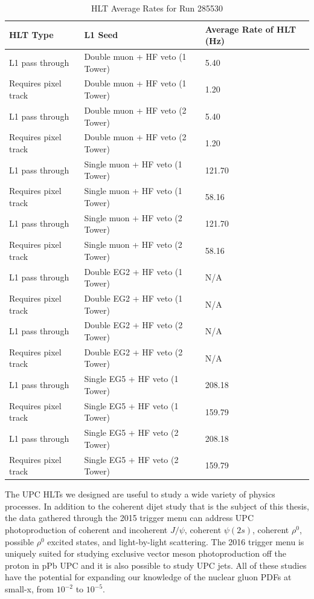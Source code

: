 \begin{table}[h!]
\centering
\caption{HLT Average Rates for Run 285530}
\label{table:trigHLTUPC2016}
\begin{tabular}{@{}lll@{}}
\toprule
HLT Type             & L1 Seed                           & Average Rate of HLT (Hz) \\ \midrule
L1 pass through      & Double muon + HF veto (1 Tower) & 5.40	                    \\
Requires pixel track & Double muon + HF veto (1 Tower) & 1.20	                    \\
L1 pass through      & Double muon + HF veto (2 Tower) & 5.40                     	\\
Requires pixel track & Double muon + HF veto (2 Tower) & 1.20                     	\\
L1 pass through      & Single muon + HF veto (1 Tower) & 121.70                   	\\
Requires pixel track & Single muon + HF veto (1 Tower) & 58.16                    	\\
L1 pass through      & Single muon + HF veto (2 Tower) & 121.70	                    \\
Requires pixel track & Single muon + HF veto (2 Tower) & 58.16                    	\\
L1 pass through      & Double EG2 + HF veto (1 Tower)  & N/A                     	\\
Requires pixel track & Double EG2 + HF veto (1 Tower)  & N/A                     	\\
L1 pass through      & Double EG2 + HF veto (2 Tower)  & N/A                  		\\
Requires pixel track & Double EG2 + HF veto (2 Tower)  & N/A                     	\\ 
L1 pass through      & Single EG5 + HF veto (1 Tower)  & 208.18          			\\
Requires pixel track & Single EG5 + HF veto (1 Tower)  & 159.79                     \\
L1 pass through      & Single EG5 + HF veto (2 Tower)  & 208.18                     \\
Requires pixel track & Single EG5 + HF veto (2 Tower)  & 159.79	                    \\ \bottomrule
\end{tabular}
\end{table}

The UPC HLTs we designed are useful to study a wide variety of physics processes. In addition to the coherent dijet study that is the subject of this thesis, the data gathered through the 2015 trigger menu can address UPC photoproduction of coherent and incoherent $J/\psi$, coherent $\psi(2s)$, coherent $\rho^0$, possible $\rho^0$ excited states, and light-by-light scattering. The 2016 trigger menu is uniquely suited for studying exclusive vector meson photoproduction off the proton in pPb UPC and it is also possible to study UPC jets. All of these studies have the potential for expanding our knowledge of the nuclear gluon PDFs at small-x, from $10^{-2}$ to $10^{-5}$.  
